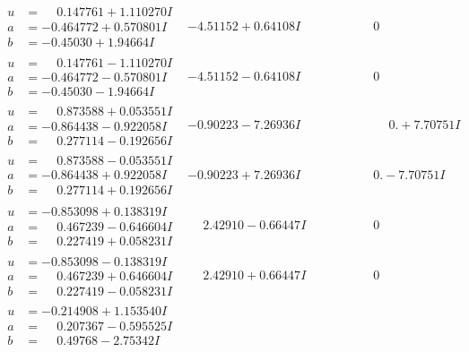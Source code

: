 \documentclass[1p]{elsarticle_modified}
\theoremstyle{definition}
\begin{document}
$$\begin{array}{c|c|c}
\begin{aligned}
u &= \phantom{-}0.147761 + 1.110270 I \\
a &= -0.464772 + 0.570801 I \\
b &= -0.45030 + 1.94664 I\end{aligned}
 & -4.51152 + 0.64108 I & \phantom{-0.000000 } 0 \\ \hline\begin{aligned}
u &= \phantom{-}0.147761 - 1.110270 I \\
a &= -0.464772 - 0.570801 I \\
b &= -0.45030 - 1.94664 I\end{aligned}
 & -4.51152 - 0.64108 I & \phantom{-0.000000 } 0 \\ \hline\begin{aligned}
u &= \phantom{-}0.873588 + 0.053551 I \\
a &= -0.864438 - 0.922058 I \\
b &= \phantom{-}0.277114 - 0.192656 I\end{aligned}
 & -0.90223 - 7.26936 I & \phantom{-0.000000 -}0. + 7.70751 I \\ \hline\begin{aligned}
u &= \phantom{-}0.873588 - 0.053551 I \\
a &= -0.864438 + 0.922058 I \\
b &= \phantom{-}0.277114 + 0.192656 I\end{aligned}
 & -0.90223 + 7.26936 I & \phantom{-0.000000 } 0. - 7.70751 I \\ \hline\begin{aligned}
u &= -0.853098 + 0.138319 I \\
a &= \phantom{-}0.467239 - 0.646604 I \\
b &= \phantom{-}0.227419 + 0.058231 I\end{aligned}
 & \phantom{-}2.42910 - 0.66447 I & \phantom{-0.000000 } 0 \\ \hline\begin{aligned}
u &= -0.853098 - 0.138319 I \\
a &= \phantom{-}0.467239 + 0.646604 I \\
b &= \phantom{-}0.227419 - 0.058231 I\end{aligned}
 & \phantom{-}2.42910 + 0.66447 I & \phantom{-0.000000 } 0 \\ \hline\begin{aligned}
u &= -0.214908 + 1.153540 I \\
a &= \phantom{-}0.207367 - 0.595525 I \\
b &= \phantom{-}0.49768 - 2.75342 I\end{aligned}

\end{array}$$
\end{document}
